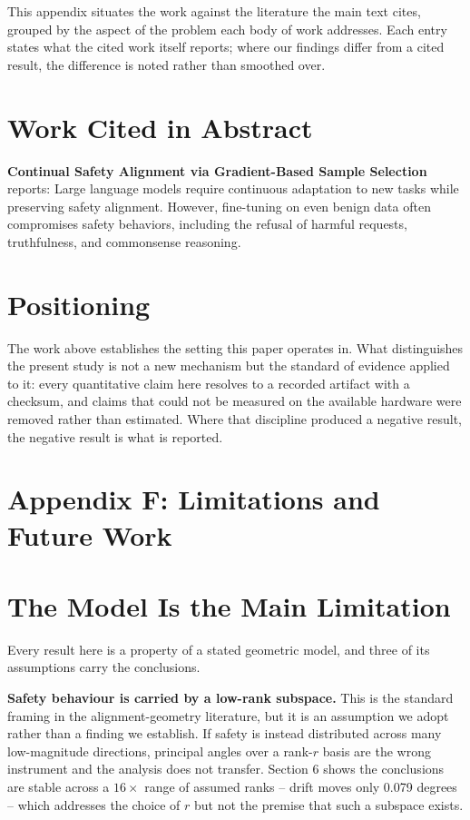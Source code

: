 \documentclass{article}
\begin{document}
This appendix situates the work against the literature the main text cites, grouped by the aspect of the problem each body of work addresses. Each entry states what the cited work itself reports; where our findings differ from a cited result, the difference is noted rather than smoothed over.


\section{Work Cited in Abstract}


\textbf{Continual Safety Alignment via Gradient-Based Sample Selection} \cite{arxiv_2604_17215} reports: Large language models require continuous adaptation to new tasks while preserving safety alignment. However, fine-tuning on even benign data often compromises safety behaviors, including the refusal of harmful requests, truthfulness, and commonsense reasoning.


\section{Positioning}


The work above establishes the setting this paper operates in. What distinguishes the present study is not a new mechanism but the standard of evidence applied to it: every quantitative claim here resolves to a recorded artifact with a checksum, and claims that could not be measured on the available hardware were removed rather than estimated. Where that discipline produced a negative result, the negative result is what is reported.





\section{Appendix F: Limitations and Future Work}



\section{The Model Is the Main Limitation}


Every result here is a property of a stated geometric model, and three of its assumptions carry the conclusions.

\textbf{Safety behaviour is carried by a low-rank subspace.} This is the standard framing in the alignment-geometry literature, but it is an assumption we adopt rather than a finding we establish. If safety is instead distributed across many low-magnitude directions, principal angles over a rank-$r$ basis are the wrong instrument and the analysis does not transfer. Section 6 shows the conclusions are stable across a $16\times$ range of assumed ranks -- drift moves only 0.079 degrees -- which addresses the choice of $r$ but not the premise that such a subspace exists.
\end{document}
